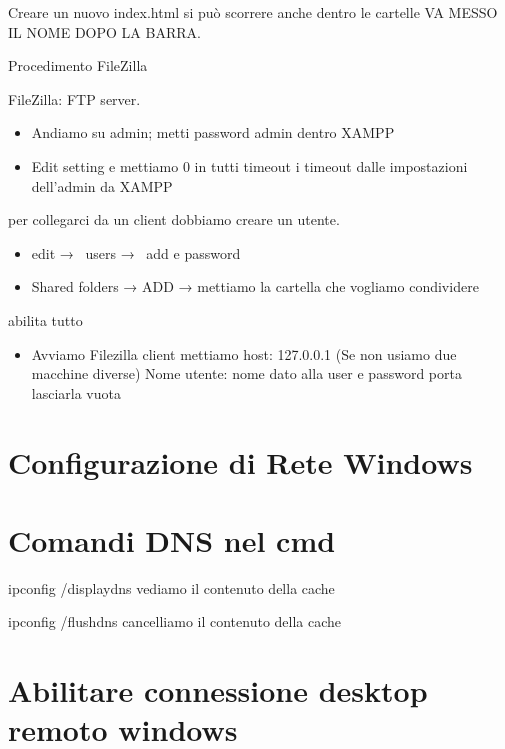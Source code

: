 \documentclass[
]{article}
\providecommand{\tightlist}{%
  \setlength{\itemsep}{0pt}\setlength{\parskip}{0pt}}
\begin{document}
{Creare un nuovo index.html si può scorrere anche dentro le cartelle VA
MESSO IL NOME DOPO LA BARRA.}

{}

{Procedimento FileZilla}

{FileZilla: FTP server.}

\begin{itemize}
\tightlist
\item
  {Andiamo su admin; metti password admin dentro XAMPP}
\item
  {Edit setting e mettiamo 0 in tutti timeout i timeout dalle
  impostazioni dell'admin da XAMPP }
\end{itemize}

{per collegarci da un client dobbiamo creare un utente. }

\begin{itemize}
\tightlist
\item
  {edit → ~users → ~add e password}
\item
  {Shared folders → ADD → mettiamo la cartella che vogliamo condividere}
\end{itemize}

{abilita tutto}

\begin{itemize}
\tightlist
\item
  {Avviamo Filezilla client mettiamo host: 127.0.0.1 (Se non usiamo due
  macchine diverse) Nome utente: nome dato alla user e password porta
  lasciarla vuota}
\end{itemize}

{}

\section{\texorpdfstring{{Configurazione di Rete
Windows}}{Configurazione di Rete Windows}}\label{h.2s8eyo1}

{}

\section{\texorpdfstring{{Comandi DNS nel
cmd}}{Comandi DNS nel cmd}}\label{h.17dp8vu}

{ipconfig /displaydns vediamo il contenuto della cache }

{ipconfig /flushdns cancelliamo il contenuto della cache}

{}

\section{\texorpdfstring{{Abilitare connessione desktop remoto
windows}}{Abilitare connessione desktop remoto windows}}\label{h.3rdcrjn}
\end{document}
